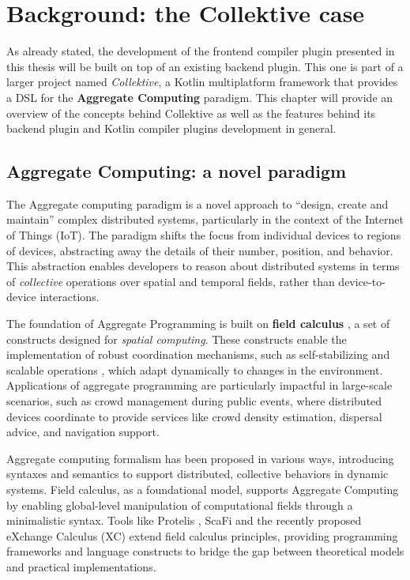 \documentclass[12pt,a4paper,openright,twoside]{book}
\begin{document}
\chapter{Background: the Collektive case}
\label{chap:background}

As already stated, the development of the frontend compiler plugin presented in
this thesis will be built on top of an existing backend plugin. This one is
part of a larger project named \emph{Collektive}, a Kotlin multiplatform
framework that provides a \ac{DSL} for the \textbf{Aggregate Computing}
\cite{Beal2015} paradigm. This chapter will provide an overview of the concepts
behind Collektive as well as the features behind its backend plugin and Kotlin
compiler plugins development in general.

\section{Aggregate Computing: a novel paradigm}

The Aggregate computing paradigm is a novel approach to ``design, create and
maintain'' \cite{Beal2015} complex distributed systems, particularly in the 
context of the Internet of Things (IoT). The paradigm shifts the focus from
individual devices to regions of devices, abstracting away the details of their
number, position, and behavior. This abstraction enables developers to reason
about distributed systems in terms of \emph{collective} operations over spatial and
temporal fields, rather than device-to-device interactions. 

The foundation of Aggregate Programming is built on \textbf{field calculus}
\cite{Beal2014TowardsAU}, a set of constructs designed for \emph{spatial
computing}. These constructs enable the implementation of robust coordination
mechanisms, such as self-stabilizing and scalable operations \cite{Viroli2018}
\cite{DBLP:journals/jlap/ViroliBDACP19}, which adapt dynamically to changes in
the environment. Applications of aggregate programming are particularly
impactful in large-scale scenarios, such as crowd management during public
events, where distributed devices coordinate to provide services like crowd
density estimation, dispersal advice, and navigation support.

Aggregate computing formalism has been proposed in various ways, introducing
syntaxes and semantics to support distributed, collective behaviors in dynamic
systems. Field calculus, as a foundational model, supports Aggregate Computing
by enabling global-level manipulation of computational fields through a
minimalistic syntax. 
%
Tools like Protelis \cite{DBLP:conf/saso/PianiniBV17}, ScaFi
\cite{DBLP:conf/ecoop/CasadeiV16} and the recently proposed eXchange Calculus
(XC) \cite{DBLP:journals/jss/AudritoCDSV24} extend field calculus principles,
providing programming frameworks and language constructs to bridge the gap
between theoretical models and practical implementations.
\end{document}
